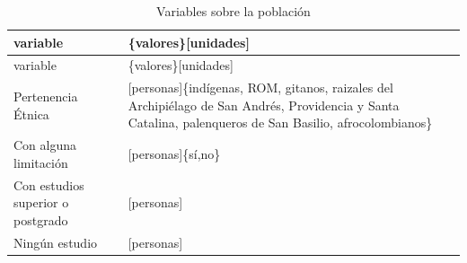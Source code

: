 \documentclass[12pt,a4paper,openany]{book}
\theoremstyle{definition}
\theoremstyle{definition}
\theoremstyle{definition}
\theoremstyle{remark}
\begin{document}
\begin{longtable}[]{@{}ll@{}}
\caption{\label{tab:vars-poblacion} Variables sobre la
población}\tabularnewline
\toprule
\begin{minipage}[b]{0.20\columnwidth}\raggedright\strut
variable\strut
\end{minipage} & \begin{minipage}[b]{0.43\columnwidth}\raggedright\strut
\{valores\}{[}unidades{]}\strut
\end{minipage}\tabularnewline
\midrule
\endfirsthead
\toprule
\begin{minipage}[b]{0.20\columnwidth}\raggedright\strut
variable\strut
\end{minipage} & \begin{minipage}[b]{0.43\columnwidth}\raggedright\strut
\{valores\}{[}unidades{]}\strut
\end{minipage}\tabularnewline
\midrule
\endhead
\begin{minipage}[t]{0.20\columnwidth}\raggedright\strut
Pertenencia Étnica\strut
\end{minipage} & \begin{minipage}[t]{0.43\columnwidth}\raggedright\strut
{[}personas{]}\{indígenas, ROM, gitanos, raizales del Archipiélago de
San Andrés, Providencia y Santa Catalina, palenqueros de San Basilio,
afrocolombianos\}\strut
\end{minipage}\tabularnewline
\begin{minipage}[t]{0.20\columnwidth}\raggedright\strut
Con alguna limitación\strut
\end{minipage} & \begin{minipage}[t]{0.43\columnwidth}\raggedright\strut
{[}personas{]}\{sí,no\}\strut
\end{minipage}\tabularnewline
\begin{minipage}[t]{0.20\columnwidth}\raggedright\strut
Con estudios superior o postgrado\strut
\end{minipage} & \begin{minipage}[t]{0.43\columnwidth}\raggedright\strut
{[}personas{]}\strut
\end{minipage}\tabularnewline
\begin{minipage}[t]{0.20\columnwidth}\raggedright\strut
Ningún estudio\strut
\end{minipage} & \begin{minipage}[t]{0.43\columnwidth}\raggedright\strut
{[}personas{]}\strut
\end{minipage}\tabularnewline
\bottomrule
\end{longtable}
\end{document}
